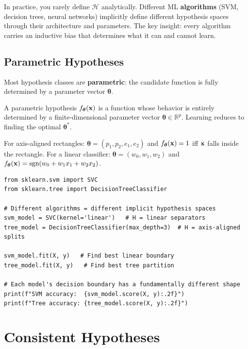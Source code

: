 In practice, you rarely define $\mathcal{H}$ analytically. Different ML \textbf{algorithms} (SVM, decision trees, neural networks) implicitly define different hypothesis spaces through their architecture and parameters. The key insight: every algorithm carries an inductive bias that determines what it can and cannot learn.

\subsection*{Parametric Hypotheses}

Most hypothesis classes are \textbf{parametric}: the candidate function is fully determined by a parameter vector $\boldsymbol{\theta}$.

\begin{definition}
A parametric hypothesis $f_{\boldsymbol{\theta}}(\mathbf{x})$ is a function whose behavior is entirely determined by a finite-dimensional parameter vector $\boldsymbol{\theta} \in \mathbb{R}^p$. Learning reduces to finding the optimal $\boldsymbol{\theta}^*$.
\end{definition}

For axis-aligned rectangles: $\boldsymbol{\theta} = (p_1, p_2, e_1, e_2)$ and $f_{\boldsymbol{\theta}}(\mathbf{x}) = 1$ iff $\mathbf{x}$ falls inside the rectangle. For a linear classifier: $\boldsymbol{\theta} = (w_0, w_1, w_2)$ and $f_{\boldsymbol{\theta}}(\mathbf{x}) = \text{sgn}(w_0 + w_1 x_1 + w_2 x_2)$.

\begin{lstlisting}[style=pythonstyle]
from sklearn.svm import SVC
from sklearn.tree import DecisionTreeClassifier

# Different algorithms = different implicit hypothesis spaces
svm_model = SVC(kernel='linear')   # H = linear separators
tree_model = DecisionTreeClassifier(max_depth=3)  # H = axis-aligned splits

svm_model.fit(X, y)   # Find best linear boundary
tree_model.fit(X, y)   # Find best tree partition

# Each model's decision boundary has a fundamentally different shape
print(f"SVM accuracy:  {svm_model.score(X, y):.2f}")
print(f"Tree accuracy: {tree_model.score(X, y):.2f}")
\end{lstlisting}

\section*{Consistent Hypotheses}

